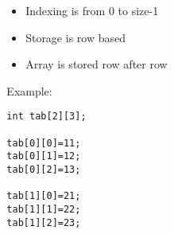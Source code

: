 \documentclass[10pt]{beamer}
\begin{document}
\begin{frame}[fragile]
\begin{columns}
\begin{column}{0.65\textwidth}
    \end{column}
    \begin{column}{0.5\textwidth}
      \begin{itemize}
        \item Indexing is from 0 to size-1
        \item Storage is row based
        \item Array is stored row after row
      \end{itemize}
Example:
\begin{lstlisting}
int tab[2][3];

tab[0][0]=11;
tab[0][1]=12;
tab[0][2]=13;

tab[1][0]=21;
tab[1][1]=22;
tab[1][2]=23;
\end{lstlisting}
\centering   
{}

    \end{column}
  \end{columns}
\end{frame}
\end{document}
